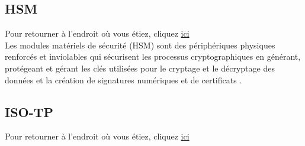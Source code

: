 \documentclass[a4paper, 12pt]{report}
\begin{document}
\subsection{HSM}\label{subsec:hsm}
Pour retourner à l'endroit où vous étiez, cliquez \hyperref[sec:contexte]{ici}\\

Les modules matériels de sécurité (HSM) sont des périphériques physiques renforcés et inviolables qui sécurisent les processus cryptographiques en générant, protégeant et gérant les clés utilisées pour le cryptage et le décryptage des données et la création de signatures numériques et de certificats \cite{entrust_hardware_security_modules}.


\subsection{ISO-TP}\label{subsec:isoTP}
Pour retourner à l'endroit où vous étiez, cliquez \hyperref[subsec:analyseL3]{ici}\\
\end{document}
